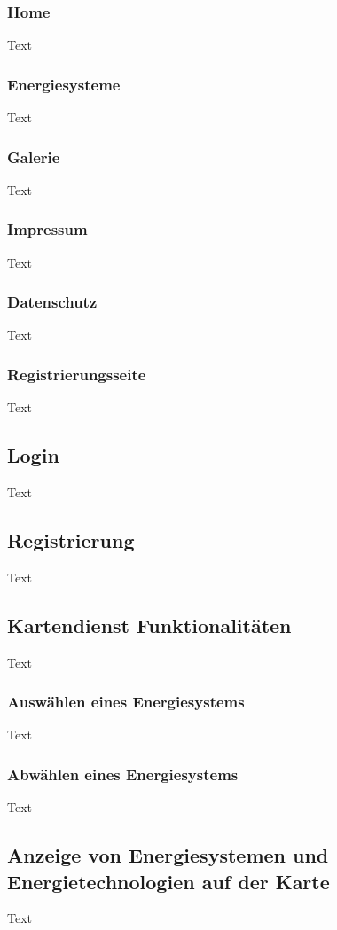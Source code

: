 \subsubsection{Home}
Text

\subsubsection{Energiesysteme}
Text

\subsubsection{Galerie}
Text

\subsubsection{Impressum}
Text

\subsubsection{Datenschutz}
Text

\subsubsection{Registrierungsseite}
Text

\subsection{Login}
Text

\subsection{Registrierung}
Text

\subsection{Kartendienst Funktionalitäten}
Text

\subsubsection{Auswählen eines Energiesystems}
Text
\subsubsection{Abwählen eines Energiesystems}
Text

\subsection{Anzeige von Energiesystemen und Energietechnologien auf der Karte}
Text
